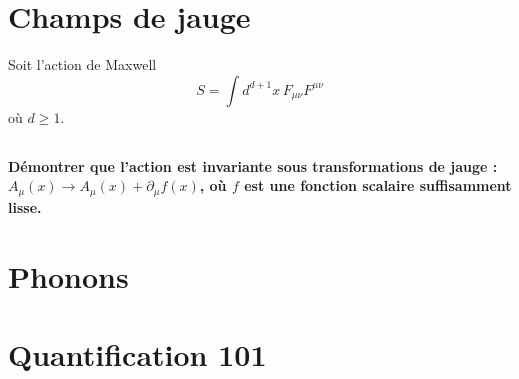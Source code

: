 \documentclass{article}
\numberwithin{equation}{section}
\theoremstyle{solution}
\begin{document}
\section{Champs de jauge}
Soit l'action de Maxwell
\begin{equation}\label{eq:MaxwellAction}
       S = \int d^{d+1}x\, F_{\mu\nu}F^{\mu\nu}
\end{equation} 
où $d \geq 1$.
\subsection{}
\textbf{Démontrer que l’action est invariante sous transformations de jauge : $A_{\mu}(x) \rightarrow A_{\mu}(x) +
        \partial_{\mu}f(x)$, où $f$ est une fonction scalaire suffisamment lisse.}
\subsection{}
\subsection{}
\subsection{}
\subsection{}

\section{Phonons}
\subsection{}
\subsection{}
\subsection{}

\section{Quantification 101}

\subsection{}
\subsection{}
\subsection{}
\subsection{}
\end{document}
